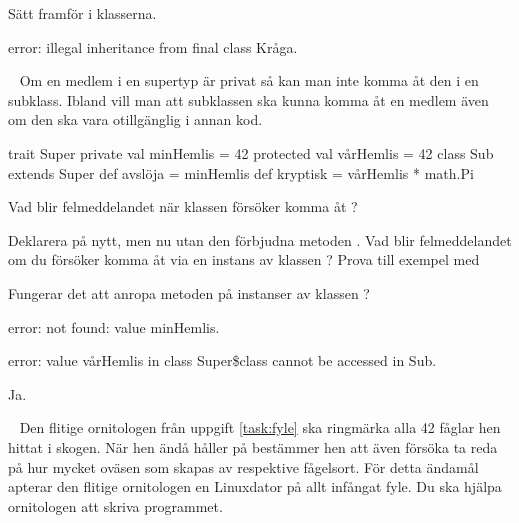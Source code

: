 \SubtaskSolved  Sätt  framför  i klasserna.

\SubtaskSolved  error: illegal inheritance from final class Kråga.


\QUESTEND







\QUESTBEGIN

\Task  \what~  Om en medlem i en supertyp är privat så kan man inte komma åt den i en subklass. Ibland vill man att subklassen ska kunna komma åt en medlem även om den ska vara otillgänglig i annan kod.

\begin{REPL}
trait Super {
  private val minHemlis = 42
  protected val vårHemlis = 42
}
class Sub extends Super {
  def avslöja = minHemlis
  def kryptisk = vårHemlis * math.Pi
}
\end{REPL}

\Subtask Vad blir felmeddelandet när klassen  försöker komma åt ?

\Subtask Deklarera  på nytt, men nu utan den förbjudna metoden . Vad blir felmeddelandet om du försöker komma åt  via en instans av klassen ? Prova till exempel med 

\Subtask Fungerar det att anropa metoden  på instanser av klassen ?

\SOLUTION


\TaskSolved \what


\SubtaskSolved  error: not found: value minHemlis.

\SubtaskSolved  error: value vårHemlis in class Super\$class cannot be accessed in Sub.

\SubtaskSolved  Ja.


\QUESTEND







\QUESTBEGIN

\Task  \what~  Den flitige ornitologen från uppgift \ref{task:fyle} ska ringmärka alla 42 fåglar hen hittat i skogen. När hen ändå håller på bestämmer hen att även försöka ta reda på hur mycket oväsen som skapas av respektive fågelsort. För detta ändamål apterar den flitige ornitologen en Linuxdator på allt infångat fyle. Du ska hjälpa ornitologen att skriva programmet.

